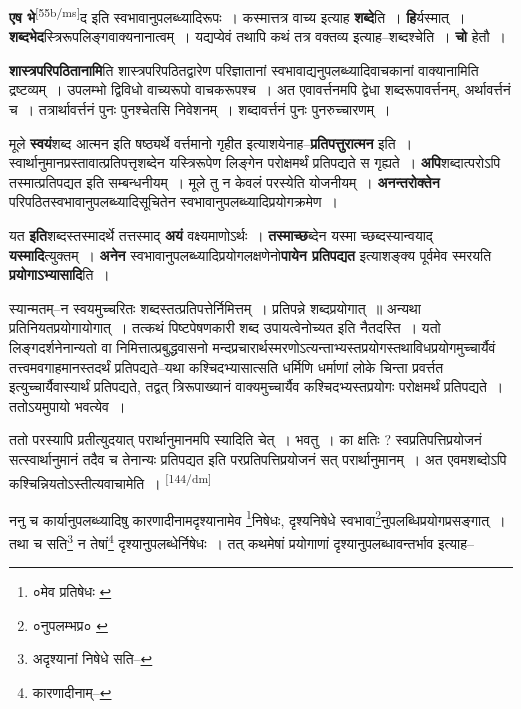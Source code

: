 \documentclass[article,12pt,a4paper]{memoir}
\begin{document}
	  \pstart \textbf{एष भे}\leavevmode\textsuperscript{\rmlatinfont\tiny [55b/ms]}द इति स्वभावानुपलब्ध्यादिरूपः । कस्मात्तत्र वाच्य इत्याह \textbf{शब्दे}ति । \textbf{हि}र्यस्मात् । \textbf{शब्दभेद}स्त्रिरूपलिङ्गवाक्यनानात्वम् । यद्यप्येवं तथापि कथं तत्र वक्तव्य इत्याह--शब्दश्चेति । \textbf{चो} हेतौ ।
	\pend
      

	  \pstart \textbf{शास्त्रपरिपठितानामि}ति शास्त्रपरिपठितद्वारेण परिज्ञातानां स्वभावाद्यनुपलब्ध्यादिवाचकानां वाक्यानामिति द्रष्टव्यम् । उपलम्भो द्विविधो वाच्यरूपो वाचकरूपश्च । अत एवावर्त्तनमपि द्वेधा शब्दरूपावर्त्तनम्, अर्थावर्त्तनं च । तत्रार्थावर्त्तनं पुनः पुनश्चेतसि निवेशनम् । शब्दावर्त्तनं पुनः पुनरुच्चारणम् ।
	\pend
      

	  \pstart मूले \textbf{स्वयं}शब्द आत्मन इति षष्ठ्यर्थे वर्त्तमानो गृहीत इत्याशयेनाह--\textbf{प्रतिपत्तुरात्मन} इति । स्वार्थानुमानप्रस्तावात्प्रतिपत्तृशब्देन यस्त्रिरूपेण लिङ्गेन परोक्षमर्थं प्रतिपद्यते स गृह्यते । \textbf{अपि}शब्दात्परोऽपि तस्मात्प्रतिपद्यत इति सम्बन्धनीयम् । मूले तु न केवलं परस्येति योजनीयम् । \textbf{अनन्तरोक्तेन} परिपठितस्वभावानुपलब्ध्यादिसूचितेन स्वभावानुपलब्ध्यादिप्रयोगक्रमेण ।
	\pend
      

	  \pstart यत \textbf{इति}शब्दस्तस्मादर्थे तत्तस्माद् \textbf{अयं} वक्ष्यमाणोऽर्थः । \textbf{तस्माच्छ}ब्देन यस्मा च्छब्दस्यान्वयाद् \textbf{यस्मादि}त्युक्तम् । \textbf{अनेन} स्वभावानुपलब्ध्यादिप्रयोगलक्षणेनो\textbf{पायेन प्रतिपद्यत} इत्याशङ्क्य पूर्वमेव स्मरयति \textbf{प्रयोगाऽभ्यासादि}ति ।
	\pend
      

	  \pstart स्यान्मतम्--न स्वयमुच्चरितः शब्दस्तत्प्रतिपत्तेर्निमित्तम् । प्रतिपन्ने शब्दप्रयोगात् ॥ अन्यथा प्रतिनियतप्रयोगायोगात् । तत्कथं पिष्टपेषणकारी शब्द उपायत्वेनोच्यत इति नैतदस्ति । यतो लिङ्गदर्शनेनान्यतो वा निमित्तात्प्रबुद्धवासनो मन्दप्रचारार्थस्मरणोऽत्यन्ताभ्यस्तप्रयोगस्तथाविधप्रयोगमुच्चार्यैवं तत्त्वमवगाहमानस्तदर्थं प्रतिपद्यते--यथा कश्चिदभ्यासात्सति धर्मिणि धर्माणां लोके चिन्ता प्रवर्त्तत इत्युच्चार्यैवास्यार्थं प्रतिपद्यते, तद्वत् त्रिरूपाख्यानं वाक्यमुच्चार्यैव कश्चिदभ्यस्तप्रयोगः परोक्षमर्थं प्रतिपद्यते । ततोऽयमुपायो भवत्येव ।
	\pend
      

	  \pstart ततो परस्यापि प्रतीत्युदयात् परार्थानुमानमपि स्यादिति चेत् । भवतु । का क्षतिः ? स्वप्रतिपत्तिप्रयोजनं सत्स्वार्थानुमानं तदैव च तेनान्यः प्रतिपद्यत इति परप्रतिपत्तिप्रयोजनं सत् परार्थानुमानम् । अत एवमशब्दोऽपि कश्चिन्नियतोऽस्तीत्यवाचामेति ।
	\pend
      \leavevmode\textsuperscript{\rmlatinfont\tiny [144/dm]}

	  \pstart ननु च कार्यानुपलब्ध्यादिषु कारणादीनामदृश्यानामेव \footnote{०मेव प्रतिषेधः \cite{dp-msA} \cite{dp-edP} \cite{dp-edH} \cite{dp-edE} \cite{dp-edN}}निषेधः, दृश्यनिषेधे स्वभावा\footnote{०नुपलम्भप्र० \cite{dp-msA} \cite{dp-msB} \cite{dp-edP} \cite{dp-edH} \cite{dp-edE} \cite{dp-edN}}नुपलब्धिप्रयोगप्रसङ्गात् । तथा च सति\footnote{अदृश्यानां निषेधे सति--\cite{dp-msD-n}} न तेषां\footnote{कारणादीनाम्--\cite{dp-msD-n}} दृश्यानुपलब्धेर्निषेधः । तत् कथमेषां प्रयोगाणां दृश्यानुपलब्धावन्तर्भाव इत्याह--
	\pend
       
\end{document}
